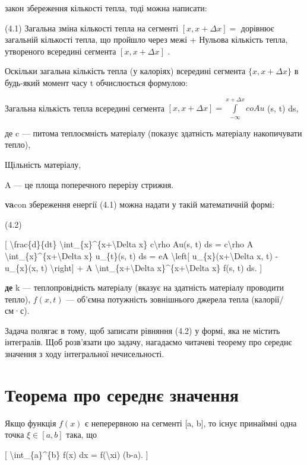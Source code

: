 \documentclass[
]{article}
\begin{document}
закон збереження кількості тепла, тоді можна написати:

(4.1) Загальна зміна кількості тепла на сегменті \([x, x + \Delta x] =\)
дорівнює загальній кількості тепла, що пройшло через межі + Нульова
кількість тепла, утвореного всередині сегмента \([x, x + \Delta x]\) .

Оскільки загальна кількість тепла (у калоріях) всередині сегмента
\(\{x, x + \Delta x\}\) в будь-який момент часу t обчислюється формулою:

Загальна кількість тепла всередині сегмента
\([x, x+\Delta x] = \int\limits_{-\infty}^{x+\Delta x} coAu\) (s, t) ds,

де c --- питома теплоємність матеріалу (показує здатність матеріалу
накопичувати тепло),

Щільність матеріалу,

A --- це площа поперечного перерізу стрижня.

\textbf{va}con збереження енергії (4.1) можна надати у такій
математичній формі:

(4.2)

{[} \textbackslash frac\{d\}\{dt\}
\textbackslash int\_\{x\}\^{}\{x+\textbackslash Delta x\}
c\textbackslash rho Au(s, t) ds = c\textbackslash rho A
\textbackslash int\_\{x\}\^{}\{x+\textbackslash Delta x\} u\_\{t\}(s, t)
ds = eA \textbackslash left{[} u\_\{x\}(x+\textbackslash Delta x, t) -
u\_\{x\}(x, t) \textbackslash right{]} + A
\textbackslash int\_\{x+\textbackslash Delta
x\}\^{}\{x+\textbackslash Delta x\} f(s, t) ds. {]}

\textbf{де} k --- теплопровідність матеріалу (вказує на здатність
матеріалу проводити тепло), \(f(x, t)\) --- об'ємна потужність
зовнішнього джерела тепла (калорії/см·с).

Задача полягає в тому, щоб записати рівняння (4.2) у формі, яка не
містить інтегралів. Щоб розв'язати цю задачу, нагадаємо читачеві теорему
про середнє значення з ходу інтегральної нечисельності.

\section{Теорема про середнє
значення}\label{ux442ux435ux43eux440ux435ux43cux430-ux43fux440ux43e-ux441ux435ux440ux435ux434ux43dux454-ux437ux43dux430ux447ux435ux43dux43dux44f}

Якщо функція \(f(x)\) є неперервною на сегменті {[}a, b{]}, то існує
принаймні одна точка \(\xi \in [a, b]\) така, що

{[} \textbackslash int\_\{a\}\^{}\{b\} f(x) dx = f(\textbackslash xi)
(b-a). {]}
\end{document}
